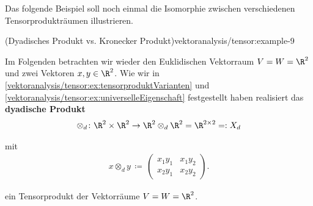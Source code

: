 \documentclass[letterpaper,10pt,german]{jupyterBook}
\begin{document}
\par
Das folgende Beispiel soll noch einmal die Isomorphie zwischen verschiedenen Tensorprodukträumen illustrieren.
\begin{example}{(Dyadisches Produkt vs. Kronecker Produkt)}{vektoranalysis/tensor:example-9}



\par
Im Folgenden betrachten wir wieder den Euklidischen Vektorraum \(V=W=\R^2\) und zwei Vektoren \(x, y \in \R^2\).
Wie wir in \cref{vektoranalysis/tensor:ex:tensorproduktVarianten} und \cref{vektoranalysis/tensor:ex:universelleEigenschaft} festgestellt haben realisiert das \textbf{dyadische Produkt}
\begin{align*}
\otimes_d \colon \R^2 \times \R^2 \rightarrow \R^2 \otimes_d \R^2 = \R^{2 \times 2} =: X_d
\end{align*}
\par
mit
\begin{align*}
x \otimes_d y \, \coloneqq \,
\begin{pmatrix}
x_1y_1 & x_1y_2 \\
x_2y_1 & x_2y_2
\end{pmatrix}.
\end{align*}
\par
ein Tensorprodukt der Vektorräume \(V=W=\R^2\).


\end{example}
\end{document}
